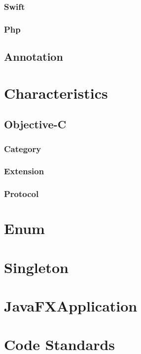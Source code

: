 \documentclass[12pt, a4pape]{article}
\begin{document}
		\subsubsection{Swift}
		\subsubsection{Php}
		
	
	\begin{figure}
		\begin{tikzpicture}
		\end{tikzpicture}
	\end{figure}
	
	\subsection{Annotation}
	
	

\section{Characteristics}
	\subsection{Objective-C}
		\subsubsection{Category}
		\subsubsection{Extension}
		\subsubsection{Protocol}


\section{Enum}
\section{Singleton}
\section{JavaFXApplication}


	
\section{Code Standards}

\clearpage
\lstlistoflistings
\end{document}
